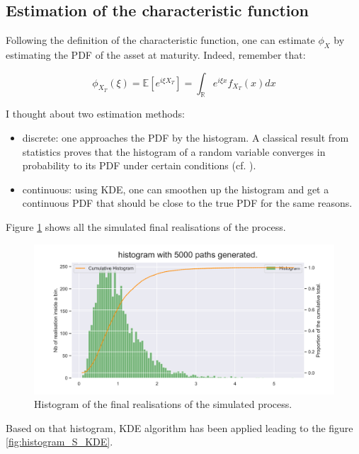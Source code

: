\subsection{Estimation of the characteristic function }


Following the definition of the characteristic function, one can estimate $\phi_X$ by estimating the PDF of the asset at maturity. Indeed, remember that:

$$\phi_{X_T} (\xi) = \mathbb E [ e^{i \xi X_T } ] = \int_{\mathbb R} e^{i \xi x } f_{X_T}(x) dx $$

I thought about two estimation methods:

\begin{itemize}
\item discrete: one approaches the PDF by the histogram. A classical result from statistics proves that the histogram of a random variable converges in probability to its PDF under certain conditions (cf. \cite{panaretos}).
\item continuous: using KDE, one can smoothen up the histogram and get a continuous PDF that should be close to the true PDF for the same reasons.
\end{itemize}

Figure \ref{fig:histogram_S} shows all the simulated final realisations of the process. 





\begin{figure}
\centering
\includegraphics[width = 0.8 \textwidth]{../addition_part/images/integration_fft/histogram_real.png}
\caption{Histogram of the final realisations of the simulated process.}
\label{fig:histogram_S}
\end{figure}

Based on that histogram, KDE algorithm has been applied leading to the figure \ref{fig:histogram_S_KDE}.




